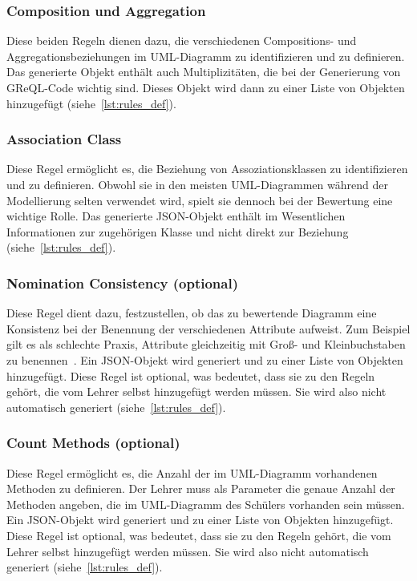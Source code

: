 \subsubsection{Composition und Aggregation}
Diese beiden Regeln dienen dazu, die verschiedenen Compositions- und Aggregationsbeziehungen im UML-Diagramm zu
identifizieren und zu definieren. Das generierte Objekt enthält auch Multiplizitäten, die bei der Generierung von
GReQL-Code wichtig sind. Dieses Objekt wird dann zu einer Liste von Objekten hinzugefügt (siehe~\ref{lst:rules_def}).

\subsubsection{Association Class}
Diese Regel ermöglicht es, die Beziehung von Assoziationsklassen zu identifizieren und zu definieren. Obwohl sie in den
meisten UML-Diagrammen während der Modellierung selten verwendet wird, spielt sie dennoch bei der Bewertung eine
wichtige Rolle. Das generierte JSON-Objekt enthält im Wesentlichen Informationen zur zugehörigen Klasse und nicht direkt
zur Beziehung (siehe~\ref{lst:rules_def}).

\subsubsection{Nomination Consistency (optional)}
Diese Regel dient dazu, festzustellen, ob das zu bewertende Diagramm eine Konsistenz bei der Benennung der verschiedenen
Attribute aufweist. Zum Beispiel gilt es als schlechte Praxis, Attribute gleichzeitig mit Groß- und Kleinbuchstaben zu
benennen~\cite{albert2003implementing}. Ein JSON-Objekt wird generiert und zu einer Liste von Objekten hinzugefügt.
Diese Regel ist optional, was bedeutet, dass sie zu den Regeln gehört, die vom Lehrer selbst hinzugefügt werden müssen.
Sie wird also nicht automatisch generiert (siehe~\ref{lst:rules_def}).

\subsubsection{Count Methods (optional)}
Diese Regel ermöglicht es, die Anzahl der im UML-Diagramm vorhandenen Methoden zu definieren. Der Lehrer muss als
Parameter die genaue Anzahl der Methoden angeben, die im UML-Diagramm des Schülers vorhanden sein müssen.
Ein JSON-Objekt wird generiert und zu einer Liste von Objekten hinzugefügt. Diese Regel ist optional, was bedeutet,
dass sie zu den Regeln gehört, die vom Lehrer selbst hinzugefügt werden müssen. Sie wird also nicht automatisch
generiert (siehe~\ref{lst:rules_def}).

